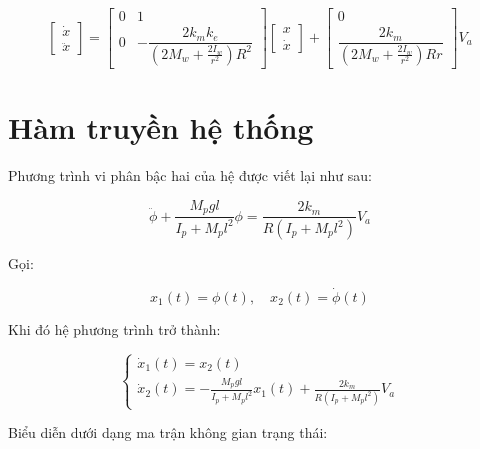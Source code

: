             \begin{equation}
                \begin{bmatrix}
                    \dot{x} \\
                    \ddot{x}
                \end{bmatrix}
                =
                \begin{bmatrix}
                    0 & 1 \\
                    0 & -\dfrac{2k_m k_e}{(2M_w + \frac{2I_w}{r^2}) R^2}
                \end{bmatrix}
                \begin{bmatrix}
                    x \\
                    \dot{x}
                \end{bmatrix}
                +
                \begin{bmatrix}
                    0 \\
                    \dfrac{2k_m}{(2M_w + \frac{2I_w}{r^2}) R r}
                \end{bmatrix}
                V_a
            \end{equation}
    \section{Hàm truyền hệ thống}

        \hspace*{0.6cm}Phương trình vi phân bậc hai của hệ được viết lại như sau:
        
        \begin{equation}
            \ddot{\phi} + \frac{M_p g l}{I_p + M_p l^2} \phi = \frac{2k_m}{R (I_p + M_p l^2)} V_a
        \end{equation}
        
        Gọi:
        
        \[
            x_1(t) = \phi(t), \quad x_2(t) = \dot{\phi}(t)
        \]
        
        Khi đó hệ phương trình trở thành:
        
        \[
        \begin{cases}
            \dot{x}_1(t) = x_2(t) \\
            \dot{x}_2(t) = -\frac{M_p g l}{I_p + M_p l^2} x_1(t) + \frac{2k_m}{R (I_p + M_p l^2)} V_a
        \end{cases}
        \]
        
        Biểu diễn dưới dạng ma trận không gian trạng thái:
        
